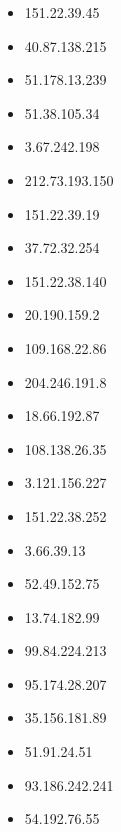 \documentclass{article}
\begin{document}
\begin{itemize}
            \item 151.22.39.45
        
            \item 40.87.138.215
        
            \item 51.178.13.239
        
            \item 51.38.105.34
        
            \item 3.67.242.198
        
            \item 212.73.193.150
        
            \item 151.22.39.19
        
            \item 37.72.32.254
        
            \item 151.22.38.140
        
            \item 20.190.159.2
        
            \item 109.168.22.86
        
            \item 204.246.191.8
        
            \item 18.66.192.87
        
            \item 108.138.26.35
        
            \item 3.121.156.227
        
            \item 151.22.38.252
        
            \item 3.66.39.13
        
            \item 52.49.152.75
        
            \item 13.74.182.99
        
            \item 99.84.224.213
        
            \item 95.174.28.207
        
            \item 35.156.181.89
        
            \item 51.91.24.51
        
            \item 93.186.242.241
        
            \item 54.192.76.55
        
    
\end{itemize}
\end{document}
